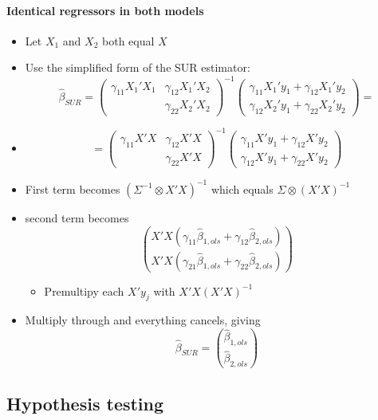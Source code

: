 \paragraph{Identical regressors in both models}
\begin{itemize}
\item Let $X_1$ and $X_2$ both equal $X$
\item Use the simplified form of the SUR estimator:
        \[\hat\beta_{SUR} = (\begin{matrix} \gamma_{11} X_1'X_1 &
        \gamma_{12} X_1'X_2 \\ & \gamma_{22}
        X_2'X_2 \end{matrix})^{-1} (\begin{matrix} \gamma_{11}
        X_1'y_1 + \gamma_{12} X_1'y_2 \\ \gamma_{12} X_2'y_1 +
        \gamma_{22} X_2'y_2\end{matrix}) = \]
\item \[= (\begin{matrix} \gamma_{11} X'X & \gamma_{12} X'X \\ &
        \gamma_{22}X'X \end{matrix})^{-1} (\begin{matrix} \gamma_{11}
        X'y_1 + \gamma_{12}X'y_2 \\ \gamma_{12} X'y_1 + \gamma_{22}
        X'y_2\end{matrix})\]
\item First term becomes $(\Sigma^{-1} \otimes X'X)^{-1}$ which
        equals $\Sigma \otimes (X'X)^{-1}$
\item second term becomes \[\binom{X'X
        (\gamma_{11}\hat\beta_{1,ols} + \gamma_{12}\hat\beta_{2,ols})}{X'X
        (\gamma_{21}\hat\beta_{1,ols} +
        \gamma_{22}\hat\beta_{2,ols})}   \]
\begin{itemize}
\item Premultipy each $X'y_j$ with $X'X(X'X)^{-1}$
\end{itemize}
\item Multiply through and everything cancels, giving
        \[\hat\beta_{SUR} = \binom{\hat\beta_{1,ols}}{\hat\beta_{2,ols}}\]
\end{itemize}

\subsection{Hypothesis testing}

